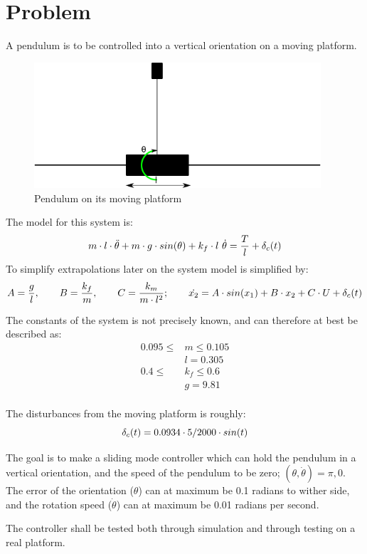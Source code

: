 \chapter{Problem}
A pendulum is to be controlled into a vertical orientation on a moving platform.
\begin{figure}[htbp]
        \centering
        \includegraphics[width=0.95\textwidth]{pendul.png}
        \caption{Pendulum on its moving platform}
        \label{fig:problem}
\end{figure}
The model for this system is:
\begin{equation}
        m\cdot l \cdot \Ddot{\theta} + m \cdot g \cdot sin(\theta) + k_f \cdot l \ \dot{\theta} = \frac{T}{l} + \delta_c(t)
\end{equation}
To simplify extrapolations later on the system model is simplified by:
\begin{equation}
        A=\frac{g}{l}, \qquad B=\frac{k_f}{m}, \qquad C= \frac{k_m}{m \cdot l^2}; \qquad \dot{x_2} = A \cdot sin(x_1) + B \cdot x_2 + C \cdot U + \delta_c(t)
\end{equation}

The constants of the system is not precisely known, and can therefore at best be described as:
\begin{equation}
        \begin{split}
                0.095 \leq &m \leq 0.105 \\
                &l = 0.305 \\
                0.4 \leq &k_f \leq 0.6 \\
                &g = 9.81 \\
        \end{split}
\end{equation}

The disturbances from the moving platform is roughly:
\begin{equation}
        \delta_c(t) = 0.0934 \cdot 5/2000 \cdot sin(t)
\end{equation}

The goal is to make a sliding mode controller which can hold the pendulum in a vertical orientation, and the speed of the pendulum to be zero; $(\theta, \dot{\theta})= \pi, 0$. The error of the orientation ($\theta$) can at maximum be 0.1 radians to wither side, and the rotation speed ($\dot{\theta}$) can at maximum be 0.01 radians per second.

The controller shall be tested both through simulation and through testing on a real platform.